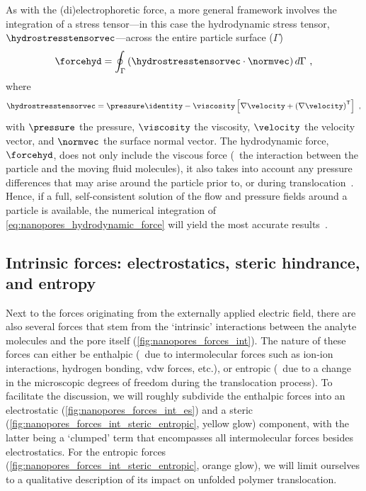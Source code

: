 As with the (di)electrophoretic force, a more general framework involves the integration of a stress
tensor---in this case the hydrodynamic stress tensor, $\hydrostresstensorvec$---across the entire particle
surface ($\Gamma$)~\cite{Ghosal-2019}
%
\begin{equation}\label{eq:nanopores_hydrodynamic_force}
  \forcehyd = \oint_{\Gamma} \left( \hydrostresstensorvec \cdot \normvec \right) d\Gamma
  \text{ ,}
\end{equation}
%
where
%
\begin{align}\label{eq:nanopores_hydrodynamic_stresstensor}
  \hydrostresstensorvec =
  \pressure\identity - \viscosity\left[\nabla\velocity + \left(\nabla\velocity \right)^\mathsf{T}\right]
  \text{ ,}
\end{align}
%
with $\pressure$ the pressure, $\viscosity$ the viscosity, $\velocity$ the velocity vector, and $\normvec$ the
surface normal vector. The hydrodynamic force, $\forcehyd$, does not only include the viscous force (\ie~the
interaction between the particle and the moving fluid molecules), it also takes into account any pressure
differences that may arise around the particle prior to, or during
translocation~\cite{Hoogerheide-2014,Wilson-2018}. Hence, if a full, self-consistent solution of the flow and
pressure fields around a particle is available, the numerical integration of
\cref{eq:nanopores_hydrodynamic_force} will yield the most accurate results~\cite{Galla-2014}.



\subsection{Intrinsic forces: electrostatics, steric hindrance, and entropy}
%

Next to the forces originating from the externally applied electric field, there are also several forces that
stem from the `intrinsic' interactions between the analyte molecules and the pore itself
(\cref{fig:nanopores_forces_int}). The nature of these forces can either be enthalpic (\ie~due to
intermolecular forces such as ion-ion interactions, hydrogen bonding, \gls{vdw} forces, etc.), or entropic
(\ie~due to a change in the microscopic degrees of freedom during the translocation process). To facilitate
the discussion, we will roughly subdivide the enthalpic forces into an electrostatic
(\cref{fig:nanopores_forces_int_es}) and a steric (\cref{fig:nanopores_forces_int_steric_entropic}, yellow
glow) component, with the latter being a `clumped' term that encompasses all intermolecular forces besides
electrostatics. For the entropic forces (\cref{fig:nanopores_forces_int_steric_entropic}, orange glow), we
will limit ourselves to a qualitative description of its impact on unfolded polymer translocation.



